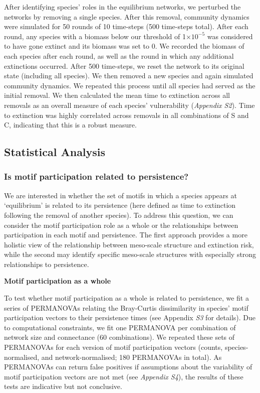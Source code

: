 \documentclass[12pt]{article}
\begin{document}
\begin{spacing}{2.0}
    		After identifying species' roles in the equilibrium networks, we perturbed the networks by removing a single species. After this removal, community dynamics were simulated for 50 rounds of 10 time-steps (500 time-steps total). After each round, any species with a biomass below our threshold of 1$\times10^{-5}$ was considered to have gone extinct and its biomass was set to 0. We recorded the biomass of each species after each round, as well as the round in which any additional extinctions occurred. After 500 time-steps, we reset the network to its original state (including all species). We then removed a new species and again simulated community dynamics. We repeated this process until all species had served as the initial removal.
    		We then calculated the mean time to extinction across all removals as an overall measure of each species' vulnerability (\emph{Appendix S2}). 
    		Time to extinction was highly correlated across removals in all combinations of S and C, indicating that this is a robust measure.


	\subsection*{Statistical Analysis}

        \subsubsection*{Is motif participation related to persistence?}

            We are interested in whether the set of motifs in which a species appears at `equilibrium' is related to its persistence (here defined as time to extinction following the removal of another species). 
            To address this question, we can consider the motif participation role as a whole or the relationships between participation in each motif and persistence. 
            The first approach provides a more holistic view of the relationship between meso-scale structure and extinction risk, while the second may identify specific meso-scale structures with especially strong relationships to persistence.


            \textbf{Motif participation as a whole}

                To test whether motif participation as a whole is related to persistence, we fit a series of PERMANOVAs relating the Bray-Curtis dissimilarity in species' motif participation vectors to their persistence times (see Appendix \emph{S3} for details). 
                Due to computational constraints, we fit one PERMANOVA per combination of network size and connectance (60 combinations). 
                We repeated these sets of PERMANOVAs for each version of motif participation vectors (counts, species-normalised, and network-normalised; 180 PERMANOVAs in total).
                As PERMANOVAs can return false positives if assumptions about the variability of motif participation vectors are not met (see \emph{Appendix S4}), the results of these tests are indicative but not conclusive.



\end{spacing}
\end{document}

